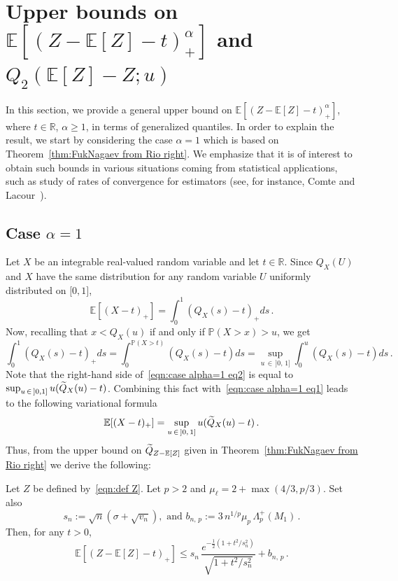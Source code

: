 \documentclass[AHL,Unicode,longabstracts,published]{cedram}
\newcommand{\bE}{\mathbb{E}}
\newcommand{\bP}{\mathbb{P}}
\newcommand{\bR}{\mathbb{R}}
\newcommand{\intervalleff}[2]{\mathopen{[} #1\mathclose{}\mathpunct{},#2\mathclose{]}}
\newcommand{\intervalleof}[2]{\mathopen{]} #1\mathclose{}\mathpunct{},#2\mathclose{]}}
\let\oldtilde\tilde
\renewcommand*{\tilde}[1]{\mathchoice{\widetilde{#1}}{\widetilde{#1}}{\oldtilde{#1}}{\oldtilde{#1}}}
\begin{document}
\section{Upper bounds on \texorpdfstring{$\bE[(Z-\bE[Z]-t)^\alpha_+]$}{} and \texorpdfstring{$Q_2(\bE[Z]-Z;u)$}{}}\label{section:bounds generalized moments}
In this section, we provide a general upper bound on $\bE[(Z-\bE[Z]-t)^\alpha_+]$, where $t\in\bR$, $\alpha\geq 1$, in terms of generalized quantiles. In order to explain the result, we start by considering the case $\alpha=1$ which is based on Theorem~\ref{thm:FukNagaev from Rio right}. We emphasize that it is of interest to obtain such bounds in various situations coming from statistical applications, such as study of rates of convergence for estimators (see, for instance, Comte and Lacour~\cite{CL13}).

\subsection{Case \texorpdfstring{$\alpha=1$}{}}
Let $X$ be an integrable real-valued random variable and let $t\in\bR$. Since $Q_X(U)$ and $X$ have the same distribution for any random variable $U$ uniformly distributed on $\intervalleff 01$,
\begin{equation}\label{eqn:case alpha=1 eq1}
\bE\left[(X-t)_+\right]=\int_0^1(Q_X(s)-t)_+ds\,.
\end{equation}
Now, recalling that $x<Q_X(u)$ if and only if $\bP(X>x)>u$, we get
\begin{equation}\label{eqn:case alpha=1 eq2}
\int_0^1(Q_X(s)-t)_+ds=\int_0^{\bP(X>t)}(Q_X(s)-t)ds=\sup_{u\,\in\,]0,\,1]}\int_0^u(Q_X(s)-t)ds\,.
\end{equation}
Note that the right-hand side of~\eqref{eqn:case alpha=1 eq2} is equal to $\sup_{u\,\in\,\intervalleof 01} u(\tilde Q_X(u)-t)$. Combining this fact with~\eqref{eqn:case alpha=1 eq1} leads to the following variational formula
\begin{equation}\label{eqn:case alpha=1 eq3}
\bE[(X-t)_+]=\sup_{u\,\in\,]0,\,1]} u(\tilde Q_X(u)-t)\,.
\end{equation}
Thus, from the upper bound on $\tilde Q_{Z-\bE[Z]}$ given in Theorem~\ref{thm:FukNagaev from Rio right} we derive the following:

\begin{prop}\label{prop:bound stat appli}
Let $Z$ be defined by~\eqref{eqn:def Z}. Let $p>2$ and $\mu_{\ell}=2+\max(4/3,p/3)$. Set also
\[
s_n:=\sqrt{n}\left(\sigma+\sqrt{v_n}\right),\text{ and } b_{n,\,p}:=3\,n^{1/p}\mu_p\,\Lambda_p^+(M_1)\,.
\]
Then, for any $t>0$,
\[
\bE\left[(Z-\bE[Z]-t)_+\right]\leq s_n\,\frac{e^{-\frac12\left(1+t^2/s_n^2\right)}}{\sqrt{1+t^2/s_n^2}}+b_{n,\,p}\,.
\]
\end{prop}
\end{document}
